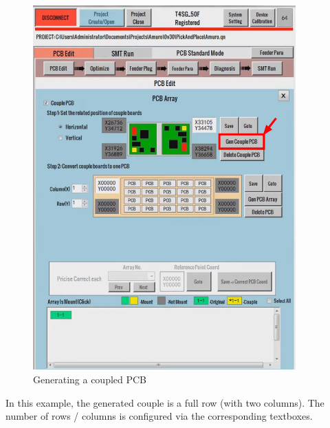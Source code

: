 \documentclass[a4paper,10pt]{report}
\begin{document}
\begin{figure}[!htb]
 \centering
 \includegraphics[width=0.9\textwidth]{scrot9.png}
 \caption{Generating a coupled PCB}
\end{figure}

\newpage
In this example, the generated couple is a full row (with two columns). The number of rows / columns is configured via the corresponding textboxes.\\
\end{document}
